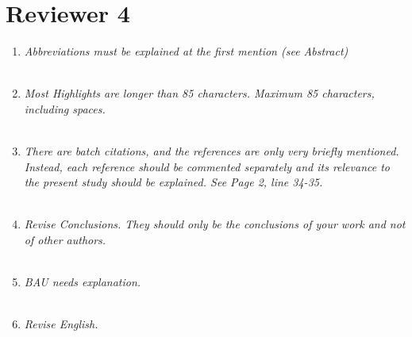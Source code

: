 \documentclass[a4paper]{amsart}
\theoremstyle{plain}
\theoremstyle{definition}
\theoremstyle{remark}
\numberwithin{equation}{section}
\begin{document}

\section*{Reviewer 4}

\begin{enumerate}

\item \emph{Abbreviations must be explained at the first mention (see Abstract)}\\

{\color{blue}{details.}}\\

\item \emph{Most Highlights are longer than 85 characters. Maximum 85 characters, including spaces.}\\

{\color{blue}{details.}}\\

\item \emph{There are batch citations, and the references are only very briefly mentioned. Instead, each reference should be commented separately and its relevance to the present study should be explained. See Page 2, line 34-35.}\\

{\color{blue}{details.}}\\

\item \emph{Revise Conclusions. They should only be the conclusions of your work and not of other authors.}\\

{\color{blue}{details.}}\\

\item \emph{BAU needs explanation.}\\

{\color{blue}{details.}}\\

\item \emph{Revise English.}\\

{\color{blue}{details.}}\\

\end{enumerate}
\end{document}
